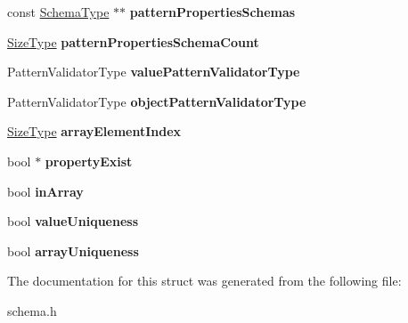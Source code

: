 \begin{DoxyCompactItemize}
\mbox{\label{a02380_a12c48f172fbaae2e883f9eb2614d860e}} 
const \hyperlink{a02356}{Schema\+Type} $\ast$$\ast$ {\bfseries pattern\+Properties\+Schemas}
\item 
\mbox{\label{a02380_a77d48b63f006479ab8c77f8192558441}} 
\hyperlink{a00560_a5ed6e6e67250fadbd041127e6386dcb5}{Size\+Type} {\bfseries pattern\+Properties\+Schema\+Count}
\item 
\mbox{\label{a02380_acc1ba6a63e678d0efff8a63d617c4d0d}} 
Pattern\+Validator\+Type {\bfseries value\+Pattern\+Validator\+Type}
\item 
\mbox{\label{a02380_add156192946b251ded2e11e24cfa9898}} 
Pattern\+Validator\+Type {\bfseries object\+Pattern\+Validator\+Type}
\item 
\mbox{\label{a02380_a213dd0b8a746b1548bb28b12a17c2c1e}} 
\hyperlink{a00560_a5ed6e6e67250fadbd041127e6386dcb5}{Size\+Type} {\bfseries array\+Element\+Index}
\item 
\mbox{\label{a02380_a3e58787498af48ecceb97c47fb592d47}} 
bool $\ast$ {\bfseries property\+Exist}
\item 
\mbox{\label{a02380_af18fc4ef754e8a52732e152854f06341}} 
bool {\bfseries in\+Array}
\item 
\mbox{\label{a02380_a23e93ca88653ed878e3ddf290fc6bd9f}} 
bool {\bfseries value\+Uniqueness}
\item 
\mbox{\label{a02380_a0864c5e8155fe0064f17e8dcb31d93c7}} 
bool {\bfseries array\+Uniqueness}
\end{DoxyCompactItemize}


The documentation for this struct was generated from the following file\+:\begin{DoxyCompactItemize}
\item 
schema.\+h\end{DoxyCompactItemize}
